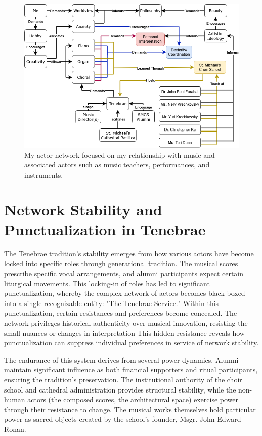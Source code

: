 \documentclass{article} %
\begin{document}
\begin{figure}[h!]            %
  \centering
  \includegraphics[width=0.9\linewidth]{Figs/Actor_Network.png}
  \caption{My actor network focused on my relationship with music and associated actors such as music teachers, performances, and instruments.}
  \label{fig:actor_network}
\end{figure}

\section{Network Stability and Punctualization in Tenebrae}

The Tenebrae tradition's stability emerges from how various actors have become locked into specific roles through generational tradition.
The musical scores prescribe specific vocal arrangements, and alumni participants expect certain liturgical movements.
This locking-in of roles has led to significant punctualization, whereby the complex network of actors becomes black-boxed into a single recognizable entity: "The Tenebrae Service."
Within this punctualization, certain resistances and preferences become concealed.
The network privileges historical authenticity over musical innovation, resisting the small nuances or changes in interpretation
This hidden resistance reveals how punctualization can suppress individual preferences in service of network stability.

The endurance of this system derives from several power dynamics. 
Alumni maintain significant influence as both financial supporters and ritual participants, ensuring the tradition's preservation. 
The institutional authority of the choir school and cathedral administration provides structural stability, while the non-human actors (the composed scores, the architectural space) exercise power through their resistance to change. 
The musical works themselves hold particular power as sacred objects created by the school's founder, Msgr. John Edward Ronan.
\end{document}
